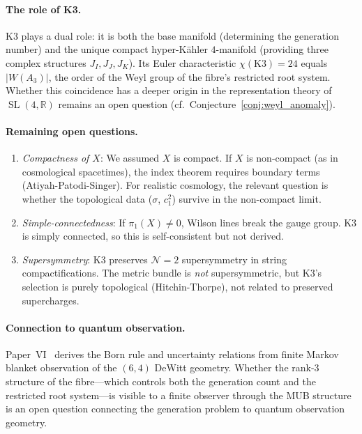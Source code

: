 \documentclass[12pt,a4paper]{article}
\theoremstyle{definition}
\newcommand{\SL}{\operatorname{SL}}
\newcommand{\R}{\mathbb{R}}
\begin{document}
\paragraph{The role of K3.}
K3 plays a dual role: it is both the base manifold (determining the generation number) and the unique compact hyper-K\"ahler $4$-manifold (providing three complex structures $J_I, J_J, J_K$).
Its Euler characteristic $\chi(\mathrm{K3}) = 24$ equals $|W(A_3)|$, the order of the Weyl group of the fibre's restricted root system.
Whether this coincidence has a deeper origin in the representation theory of $\SL(4,\R)$ remains an open question (cf.\ Conjecture~\ref{conj:weyl_anomaly}).

\paragraph{Remaining open questions.}
\begin{enumerate}[nosep]
\item \emph{Compactness of $X$}: We assumed $X$ is compact.
If $X$ is non-compact (as in cosmological spacetimes), the index theorem requires boundary terms (Atiyah-Patodi-Singer).
For realistic cosmology, the relevant question is whether the topological data ($\sigma$, $c_1^2$) survive in the non-compact limit.

\item \emph{Simple-connectedness}: If $\pi_1(X) \neq 0$, Wilson lines break the gauge group.
K3 is simply connected, so this is self-consistent but not derived.

\item \emph{Supersymmetry}: K3 preserves $\mathcal{N} = 2$ supersymmetry in string compactifications.
The metric bundle is \emph{not} supersymmetric, but K3's selection is purely topological (Hitchin-Thorpe), not related to preserved supercharges.
\end{enumerate}

\paragraph{Connection to quantum observation.}
Paper~VI~\cite{Paper6} derives the Born rule and uncertainty relations from finite Markov blanket observation of the $(6,4)$ DeWitt geometry.
Whether the rank-3 structure of the fibre---which controls both the generation count and the restricted root system---is visible to a finite observer through the MUB structure is an open question connecting the generation problem to quantum observation geometry.




\end{document}
